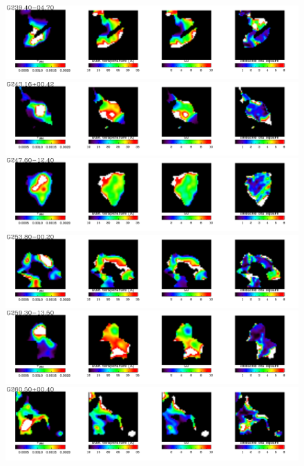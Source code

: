  \begin{figure}
\centering
\includegraphics[trim=0 2mm 0 0, clip, width=190mm]{appA/appA_60.pdf}
\includegraphics[trim=0 2mm 0 0, clip, width=190mm]{appA/appA_61.pdf}
\includegraphics[trim=0 2mm 0 0, clip, width=190mm]{appA/appA_62.pdf}
\includegraphics[trim=0 2mm 0 0, clip, width=190mm]{appA/appA_63.pdf}
\includegraphics[trim=0 2mm 0 0, clip, width=190mm]{appA/appA_64.pdf}
\includegraphics[trim=0 2mm 0 0, clip, width=190mm]{appA/appA_65.pdf}
  \end{figure}
  
